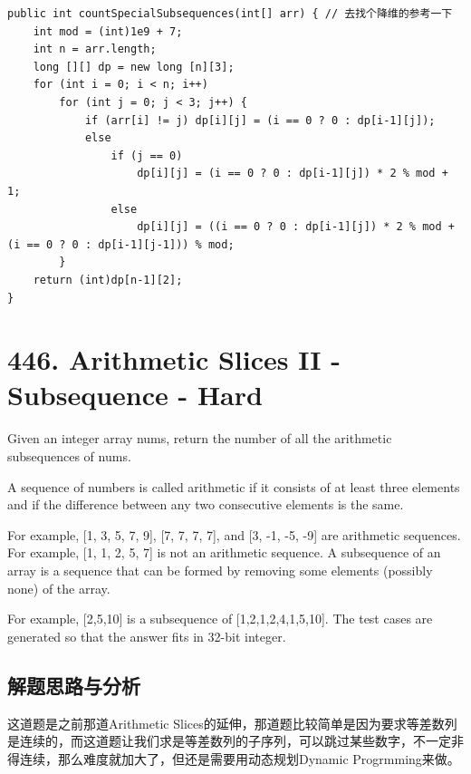 \documentclass[9pt, b5paaper]{book}
\begin{document}
\begin{verbatim}
public int countSpecialSubsequences(int[] arr) { // 去找个降维的参考一下
    int mod = (int)1e9 + 7;
    int n = arr.length;
    long [][] dp = new long [n][3];
    for (int i = 0; i < n; i++) 
        for (int j = 0; j < 3; j++) {
            if (arr[i] != j) dp[i][j] = (i == 0 ? 0 : dp[i-1][j]);
            else 
                if (j == 0)
                    dp[i][j] = (i == 0 ? 0 : dp[i-1][j]) * 2 % mod + 1;
                else
                    dp[i][j] = ((i == 0 ? 0 : dp[i-1][j]) * 2 % mod + (i == 0 ? 0 : dp[i-1][j-1])) % mod;
        }
    return (int)dp[n-1][2];
}
\end{verbatim}

\section{446. Arithmetic Slices II - Subsequence - Hard}
\label{sec-2-67}
Given an integer array nums, return the number of all the arithmetic subsequences of nums.

A sequence of numbers is called arithmetic if it consists of at least three elements and if the difference between any two consecutive elements is the same.

For example, [1, 3, 5, 7, 9], [7, 7, 7, 7], and [3, -1, -5, -9] are arithmetic sequences.
For example, [1, 1, 2, 5, 7] is not an arithmetic sequence.
A subsequence of an array is a sequence that can be formed by removing some elements (possibly none) of the array.

For example, [2,5,10] is a subsequence of [1,2,1,2,4,1,5,10].
The test cases are generated so that the answer fits in 32-bit integer.
\subsection{解题思路与分析}
\label{sec-2-67-1}
这道题是之前那道Arithmetic Slices的延伸，那道题比较简单是因为要求等差数列是连续的，而这道题让我们求是等差数列的子序列，可以跳过某些数字，不一定非得连续，那么难度就加大了，但还是需要用动态规划Dynamic Progrmming来做。
\end{document}
